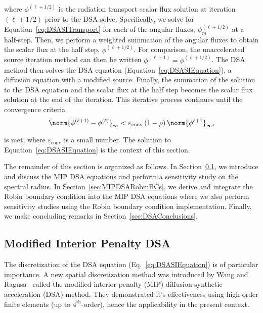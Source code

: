 \documentclass[12pt]{article}
\begin{document}
\noindent where $\phi^{(\ell+1/2)}$ is the radiation transport scalar flux solution at iteration $(\ell+1/2)$ prior to the DSA solve. Specifically, we solve for Equation~\ref{eq:DSASITransport} for each of the angular fluxes, $\psi^{(\ell+1/2)}_m$ at a half-step. Then, we perform a weighted summation of the angular fluxes to obtain the scalar flux at the half step, $\phi^{(\ell+1/2)}$. For comparison, the unaccelerated source iteration method can then be written $\phi^{(\ell+1)} = \phi^{(\ell+1/2)}$. The DSA method then solves the DSA equation (Equation~\ref{eq:DSASIEquation}), a diffusion equation with a modified source. Finally, the summation of the solution to the DSA equation and the scalar flux at the half step becomes the scalar flux solution at the end of the iteration. This iterative process continues until the convergence criteria
\begin{equation}
\norm{\phi^{\left(\ell+1 \right)} - \phi^{\left(\ell \right)}}_\infty < \varepsilon_\text{conv} \left(1 - \rho \right) \norm{\phi^{\ell+1}}_\infty,
\label{eq:ModifiedConvergenceCriteria}
\end{equation}

\noindent is met, where $\varepsilon_\text{conv}$ is a small number. The solution to Equation~\ref{eq:DSASIEquation} is the context of this section.

The remainder of this section is organized as follows. In Section~\ref{sec:MIPDSA}, we introduce and discuss the MIP DSA equations and perform a sensitivity study on the spectral radius. In Section~\ref{sec:MIPDSARobinBCs}, we derive and integrate the Robin boundary condition into the MIP DSA equations where we also perform sensitivity studies using the Robin boundary condition implementation. Finally, we make concluding remarks in Section~\ref{sec:DSAConclusions}.

\subsection{Modified Interior Penalty DSA}
\label{sec:MIPDSA}
The discretization of the DSA equation (Eq.~\ref{eq:DSASIEquation}) is of particular importance. A new spatial discretization method was introduced by Wang and Ragusa~\cite{WangRagusaDSA} called the modified interior penalty (MIP) diffusion synthetic acceleration (DSA) method. They demonstrated it's effectiveness using high-order finite elements (up to $4^\text{th}$-order), hence the applicability in the present context.
\end{document}
